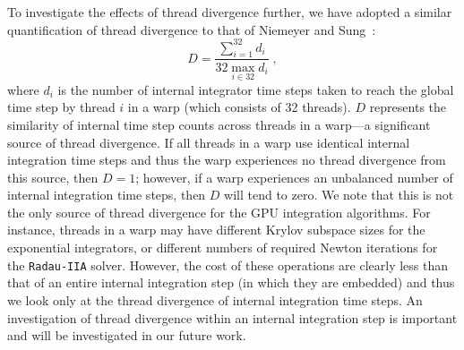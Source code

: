 \documentclass[final,twocolumn]{elsarticle}
\begin{document}
To investigate the effects of thread divergence further, we have adopted a similar quantification of thread divergence to that of Niemeyer and Sung~\cite{Niemeyer:2014aa}:
\begin{equation}
	D = \frac{\sum_{i=1}^{32}{d_i}}{32 \max_{i \in 32} d_i} \;,
	\label{eqn:divergence}
\end{equation}
where $d_i$ is the number of internal integrator time steps taken to reach the global time step by thread $i$ in a warp (which consists of 32 threads).
$D$ represents the similarity of internal time step counts across threads in a warp---a significant source of thread divergence.
If all threads in a warp use identical internal integration time steps and thus the warp experiences no thread divergence from this source, then $D = 1$; however, if a warp experiences an unbalanced number of internal integration time steps, then $D$ will tend to zero.
We note that this is not the only source of thread divergence for the GPU integration algorithms.
For instance, threads in a warp may have different Krylov subspace sizes for the exponential integrators, or different numbers of required Newton iterations for the \texttt{Radau-IIA} solver.
However, the cost of these operations are clearly less than that of an entire internal integration step (in which they are embedded) and thus we look only at the thread divergence of internal integration time steps.
An investigation of thread divergence within an internal integration step is important and will be investigated in our future work.
\end{document}
